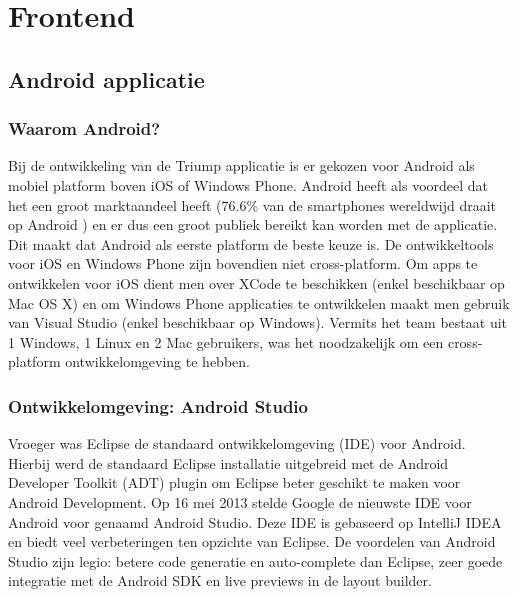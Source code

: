 \section{Frontend}
\subsection{Android applicatie}
\subsubsection{Waarom Android?}

Bij de ontwikkeling van de Triump applicatie is er gekozen voor Android als mobiel platform boven iOS of Windows Phone. Android heeft als voordeel dat het een groot marktaandeel heeft (76.6\% van de smartphones wereldwijd draait op Android \cite{marketshare}) en er dus een groot publiek bereikt kan worden met de applicatie. Dit maakt dat Android als eerste platform de beste keuze is. De ontwikkeltools voor iOS en Windows Phone zijn bovendien niet cross-platform. Om apps te ontwikkelen voor iOS dient men over XCode te beschikken (enkel beschikbaar op Mac OS X) en om Windows Phone applicaties te ontwikkelen maakt men gebruik van Visual Studio (enkel beschikbaar op Windows). Vermits het team bestaat uit 1 Windows, 1 Linux en 2 Mac gebruikers, was het noodzakelijk om een cross-platform ontwikkelomgeving te hebben.
\subsubsection{Ontwikkelomgeving: Android Studio}
Vroeger was Eclipse de standaard ontwikkelomgeving (IDE) voor Android. Hierbij werd de standaard Eclipse installatie uitgebreid met de Android Developer Toolkit (ADT) plugin om Eclipse beter geschikt te maken voor Android Development. Op 16 mei 2013 stelde Google de nieuwste IDE voor Android voor genaamd Android Studio. Deze IDE is gebaseerd op IntelliJ IDEA en biedt veel verbeteringen ten opzichte van Eclipse. 
De voordelen van Android Studio zijn legio: betere code generatie en auto-complete dan Eclipse, zeer goede integratie met de Android SDK en live previews in de layout builder. 


